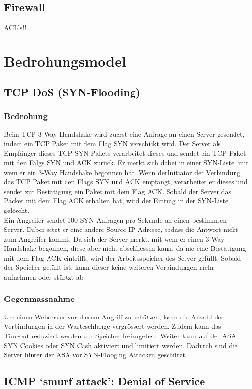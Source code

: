 \documentclass[11pt,a4paper,parskip=half]{scrartcl}
\begin{document}
\subsection{Firewall}
ACL's!!

\section{Bedrohungsmodel}
\subsection{TCP DoS (SYN-Flooding)}
\subsubsection{Bedrohung}
Beim TCP 3-Way Handshake wird zuerst eine Anfrage an einen Server gesendet, indem ein TCP Paket mit dem Flag SYN verschickt wird. Der Server als Empfänger dieses TCP SYN Pakets verarbeitet dieses und sendet ein TCP Paket mit den Falgs SYN und ACK zurück. Er merkt sich dabei in einer SYN-Liste, mit wem er ein 3-Way Handshake begonnen hat. Wenn derInitiator der Verbindung das TCP Paket mit den Flags SYN und ACK empfängt, verarbeitet er dieses und sendet zur Bestätigung ein Paket mit dem Flag ACK. Sobald der Server das Packet mit dem Flag ACK erhalten hat, wird der Eintrag in der SYN-Liste gelöscht.\\
Ein Angreifer sendet 100 SYN-Anfragen pro Sekunde an einen bestimmten Server. Dabei setzt er eine andere Source IP Adresse, sodass die Antwort nicht zum Angreifer kommt. Da sich der Server merkt, mit wem er einen 3-Way Handshake begonnen, diese aber nicht abschliessen kann, da nie eine Bestätigung mit dem Flag ACK eintrifft, wird der Arbeitsspeicher des Server gefüllt. Sobald der Speicher gefüllt ist, kann dieser keine weiteren Verbindungen mehr aufnehmen oder stürtzt ab.
\subsubsection{Gegenmassnahme}
Um einen Webserver vor diesem Angriff zu schützen, kann die Anzahl der Verbindungen in der Warteschlange vergrössert werden. Zudem kann das Timeout reduziert werden um Speicher freizugeben. Weiter kann auf der ASA SYN Cookies oder SYN Cash aktiviert und limitiert werden. Dadurch sind die Server hinter der ASA vor SYN-Flooging Attacken geschützt.\\

\subsection{ICMP ‘smurf attack’: Denial of Service}
\end{document}
